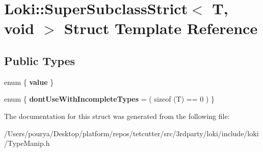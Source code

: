 \hypertarget{structLoki_1_1SuperSubclassStrict_3_01T_00_01void_01_4}{}\section{Loki\+:\+:Super\+Subclass\+Strict$<$ T, void $>$ Struct Template Reference}
\label{structLoki_1_1SuperSubclassStrict_3_01T_00_01void_01_4}
\subsection*{Public Types}
\begin{DoxyCompactItemize}
\item 
\hypertarget{structLoki_1_1SuperSubclassStrict_3_01T_00_01void_01_4_acef746d14153b330ccca2fb39727c6ac}{}enum \{ {\bfseries value}
 \}\label{structLoki_1_1SuperSubclassStrict_3_01T_00_01void_01_4_acef746d14153b330ccca2fb39727c6ac}

\item 
\hypertarget{structLoki_1_1SuperSubclassStrict_3_01T_00_01void_01_4_a729f3eec70591a8e64dd20e1127c8112}{}enum \{ {\bfseries dont\+Use\+With\+Incomplete\+Types} = ( sizeof (T) == 0 )
 \}\label{structLoki_1_1SuperSubclassStrict_3_01T_00_01void_01_4_a729f3eec70591a8e64dd20e1127c8112}

\end{DoxyCompactItemize}


The documentation for this struct was generated from the following file\+:\begin{DoxyCompactItemize}
\item 
/\+Users/pourya/\+Desktop/platform/repos/tetcutter/src/3rdparty/loki/include/loki/Type\+Manip.\+h\end{DoxyCompactItemize}

